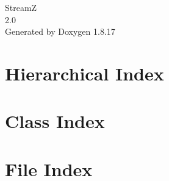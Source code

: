 \let\mypdfximage\pdfximage\def\pdfximage{\immediate\mypdfximage}\documentclass[twoside]{book}
\newcommand{\+}{\discretionary{\mbox{\scriptsize$\hookleftarrow$}}{}{}}
\newcommand{\clearemptydoublepage}{%
  \newpage{\pagestyle{empty}\cleardoublepage}%
}
\begin{document}
\hypersetup{pageanchor=false,
             bookmarksnumbered=true,
             pdfencoding=unicode
            }
\begin{titlepage}
\vspace*{7cm}
\begin{center}%
{\Large StreamZ \\[1ex]\large 2.\+0 }\\
\vspace*{1cm}
{\large Generated by Doxygen 1.8.17}\\
\end{center}
\end{titlepage}
\clearemptydoublepage
{}
\tableofcontents
\clearemptydoublepage
{}
\hypersetup{pageanchor=true}

\chapter{Hierarchical Index}

\chapter{Class Index}

\chapter{File Index}

\end{document}
